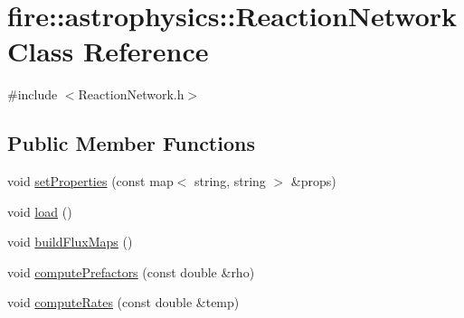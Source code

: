 \hypertarget{a00023}{}\section{fire\+:\+:astrophysics\+:\+:Reaction\+Network Class Reference}
\label{a00023}


{\ttfamily \#include $<$Reaction\+Network.\+h$>$}

\subsection*{Public Member Functions}
\begin{DoxyCompactItemize}
\item 
void \hyperlink{a00023_ab4713cafb974ca41bf6a55619e9fd875}{set\+Properties} (const map$<$ string, string $>$ \&props)
\item 
void \hyperlink{a00023_aa9b4de0566ab0b0f148677d8b97e8c49}{load} ()
\item 
void \hyperlink{a00023_aa0c06237ae72e698aee9cf72d0032fd8}{build\+Flux\+Maps} ()
\item 
void \hyperlink{a00023_ac5b97490e667b011b5e2bea92e16f8b7}{compute\+Prefactors} (const double \&rho)
\item 
void \hyperlink{a00023_a3b1fee4e28576c677d7b852e91c6fa98}{compute\+Rates} (const double \&temp)
\end{DoxyCompactItemize}

